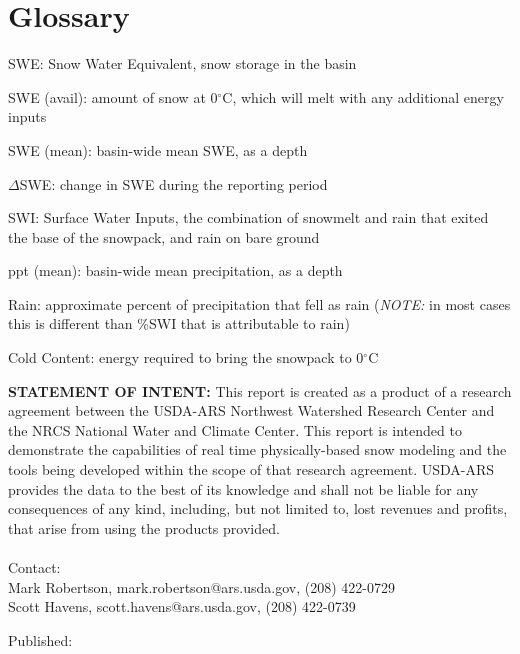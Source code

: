 \documentclass[11pt, oneside]{article}   	%
\begin{document}
\clearpage
\section*{Glossary}

\begin{itemize}
	\setlength\itemsep{0.05em}
	\footnotesize{
		\item[] SWE: Snow Water Equivalent, snow storage in the basin
		\item[] SWE (avail): amount of snow at 0$^{\circ}$C, which will melt with any additional energy inputs
		\item[] SWE (mean): basin-wide mean SWE, as a depth
		\item[] $\Delta$SWE: change in SWE during the reporting period
		\item[] SWI: Surface Water Inputs, the combination of snowmelt and rain that exited the base of the snowpack, and rain on bare ground
		\item[] ppt (mean): basin-wide mean precipitation, as a depth
		\item[] Rain: approximate percent of precipitation that fell as rain (\textit{NOTE:} in most cases this is different than \%SWI that is attributable to rain)
		\item[] Cold Content: energy required to bring the snowpack to 0$^{\circ}$C
	}
\end{itemize}

\vspace{1cm}

\noindent\textbf{STATEMENT OF INTENT:} This report is created as a product of a research agreement between the USDA-ARS Northwest Watershed Research Center and the NRCS National Water and Climate Center. This report is intended to demonstrate the capabilities of real time physically-based snow modeling and the tools being developed within the scope of that research agreement. USDA-ARS provides the data to the best of its knowledge and shall not be liable for any consequences of any kind, including, but not limited to, lost revenues and profits, that arise from using the products provided. \\
\vspace{1cm}  \\
\noindent
Contact: \\
\hspace{2cm} Mark Robertson, mark.robertson@ars.usda.gov, (208) 422-0729 \\
\hspace{2cm} Scott Havens, scott.havens@ars.usda.gov, (208) 422-0739 \\

\par\vspace*{\fill}
\noindent
\footnotesize{
Published: 
}
\end{document}
